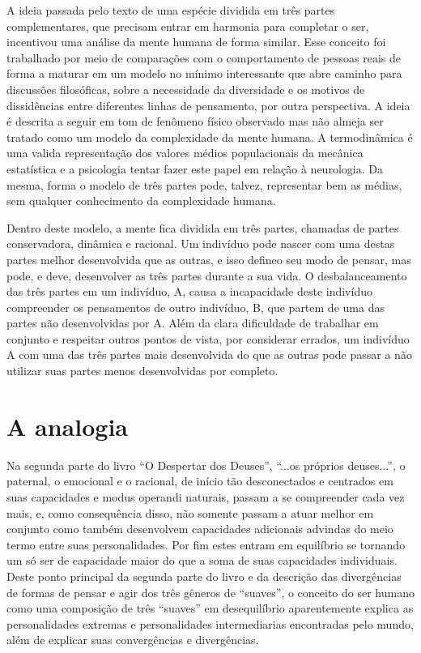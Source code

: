\documentclass[14pt,portuguese]{extreport}
\begin{document}
    A ideia passada pelo texto de uma espécie dividida em três partes
    complementares, que precisam entrar em harmonia para completar o
    ser, incentivou uma análise da mente humana de forma similar. Esse
    conceito foi trabalhado por meio de comparações com o
    comportamento de pessoas reais de forma a maturar em um modelo no
    mínimo interessante que abre caminho para discussões filosóficas,
    sobre a necessidade da diversidade e os motivos de dissidências entre
    diferentes linhas de pensamento, por outra perspectiva. A ideia é
    descrita a seguir em tom de fenômeno físico observado mas não almeja
    ser tratado como um modelo da complexidade da mente humana. A
    termodinâmica é uma valida representação dos valores médios
    populacionais da mecânica estatística e a psicologia tentar fazer este
    papel em relação à neurologia. Da mesma, forma o modelo de três
    partes pode, talvez, representar bem as médias, sem qualquer
    conhecimento da complexidade humana.
    
    Dentro deste modelo, a mente fica dividida em três partes, chamadas
    de partes conservadora, dinâmica e racional. Um indivíduo pode nascer
    com uma destas partes melhor desenvolvida que as outras, e isso defineo seu modo de pensar, mas pode, e deve, desenvolver as três partes
    durante a sua vida. O desbalanceamento das três partes em um
    indivíduo, A, causa a incapacidade deste indivíduo compreender os
    pensamentos de outro indivíduo, B, que partem de uma das partes não
    desenvolvidas por A. Além da clara dificuldade de trabalhar em conjunto
    e respeitar outros pontos de vista, por considerar errados, um indivíduo
    A com uma das três partes mais desenvolvida do que as outras pode
    passar a não utilizar suas partes menos desenvolvidas por completo.

    \section{A analogia}
    
      Na segunda parte do livro “O Despertar dos Deuses”, “...os próprios
      deuses...”, o paternal, o emocional e o racional, de início tão
      desconectados e centrados em suas capacidades e modus operandi
      naturais, passam a se compreender cada vez mais, e, como
      consequência disso, não somente passam a atuar melhor em conjunto
      como também desenvolvem capacidades adicionais advindas do meio
      termo entre suas personalidades. Por fim estes entram em equilíbrio se
      tornando um só ser de capacidade maior do que a soma de suas
      capacidades individuais. Deste ponto principal da segunda parte do livro
      e da descrição das divergências de formas de pensar e agir dos três
      gêneros de “suaves”, o conceito do ser humano como uma composição
      de três “suaves” em desequilíbrio aparentemente explica as
      personalidades extremas e personalidades intermediarias encontradas
      pelo mundo, além de explicar suas convergências e divergências.
      
\end{document}
